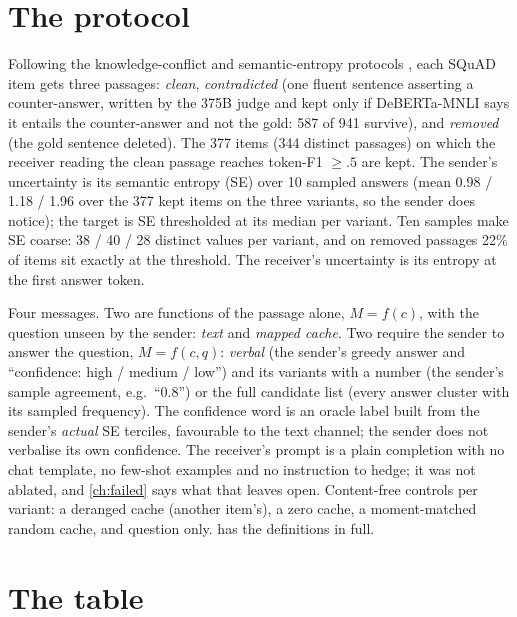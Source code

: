 \documentclass[11pt,a4paper]{report}
\begin{document}
\section{The protocol}

Following the knowledge-conflict and semantic-entropy protocols \citep{longpre2021entity,xie2023adaptive,farquhar2024detecting}, each SQuAD item gets three passages: \emph{clean}, \emph{contradicted} (one fluent sentence asserting a counter-answer, written by the 375B judge and kept only if DeBERTa-MNLI says it entails the counter-answer and not the gold: 587 of 941 survive), and \emph{removed} (the gold sentence deleted). The 377 items (344 distinct passages) on which the receiver reading the clean passage reaches token-F1 $\ge .5$ are kept. The sender's uncertainty is its semantic entropy (SE) over 10 sampled answers (mean 0.98 / 1.18 / 1.96 over the 377 kept items on the three variants, so the sender does notice); the target is SE thresholded at its median per variant. Ten samples make SE coarse: 38 / 40 / 28 distinct values per variant, and on removed passages 22\% of items sit exactly at the threshold. The receiver's uncertainty is its entropy at the first answer token.

Four messages. Two are functions of the passage alone, $M = f(c)$, with the question unseen by the sender: \emph{text} and \emph{mapped cache}. Two require the sender to answer the question, $M = f(c, q)$: \emph{verbal} (the sender's greedy answer and ``confidence: high / medium / low'') and its variants with a number (the sender's sample agreement, e.g.\ ``0.8'') or the full candidate list (every answer cluster with its sampled frequency). The confidence word is an oracle label built from the sender's \emph{actual} SE terciles, favourable to the text channel; the sender does not verbalise its own confidence. The receiver's prompt is a plain completion with no chat template, no few-shot examples and no instruction to hedge; it was not ablated, and \cref{ch:failed} says what that leaves open. Content-free controls per variant: a deranged cache (another item's), a zero cache, a moment-matched random cache, and question only.  has the definitions in full.

\section{The table}
\end{document}

